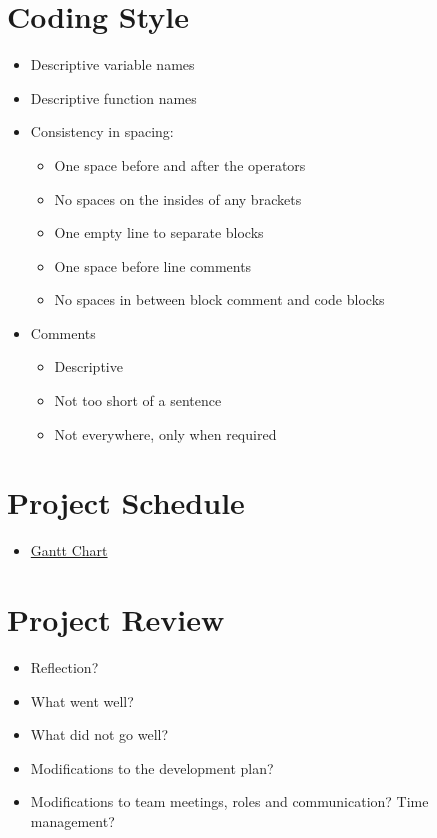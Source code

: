 \documentclass{article}
\begin{document}
\section{Coding Style}
\begin{itemize}
\item Descriptive variable names
\item Descriptive function names
\item Consistency in spacing:
\begin{itemize}
\item One space before and after the operators
\item No spaces on the insides of any brackets
\item One empty line to separate blocks
\item One space before line comments
\item No spaces in between block comment and code blocks
\end{itemize}
\item Comments
\begin{itemize}
\item Descriptive
\item Not too short of a sentence
\item Not everywhere, only when required
\end{itemize}
\end{itemize}
\section{Project Schedule}
\begin{itemize}

\item \href{run:GanttChart.gan} {Gantt Chart}\\

\end{itemize}
\section{Project Review}
\begin{itemize}
\item Reflection?
\item What went well?
\item  What did not go well?
\item Modifications to the development plan?
\item Modifications to team meetings, roles and communication? Time management?
\end{itemize}
\end{document}
